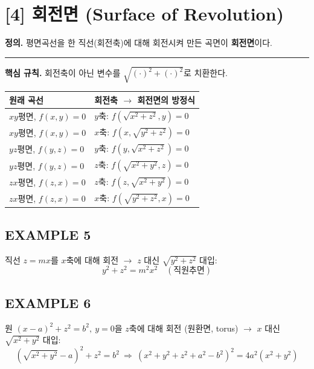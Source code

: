 \documentclass{article}
\theoremstyle{mystyle}
\begin{document}
\section*{[4] 회전면 (Surface of Revolution)}

\begin{tcolorbox}[
    colback=teal!4,
    colframe=teal!65!black,
    title=정의 \& 핵심 규칙,
    fonttitle=\bfseries,
    boxrule=0.5mm,
    arc=3mm
    ]
    \textbf{\textcolor{teal!65!black}{정의.}}\quad
    평면곡선을 한 직선(회전축)에 대해 회전시켜 만든 곡면이 \textbf{회전면}이다.

    \noindent\textcolor{teal!50!black}{\rule{\linewidth}{0.4pt}}

    \textbf{\textcolor{teal!65!black}{핵심 규칙.}}\quad
    회전축이 아닌 변수를 \(\sqrt{(\cdot)^2+(\cdot)^2}\)로 치환한다.
\end{tcolorbox}


\begin{center}
\renewcommand{\arraystretch}{1.3}
\begin{tabular}{|l|l|}
\hline
원래 곡선 & 회전축 $\to$ 회전면의 방정식 \\
\hline
\(xy\)평면, \(f(x,y)=0\) & \(y\)축: \(f(\sqrt{x^2+z^2},y)=0\) \\
\hline
\(xy\)평면, \(f(x,y)=0\) & \(x\)축: \(f(x,\sqrt{y^2+z^2})=0\) \\
\hline
\(yz\)평면, \(f(y,z)=0\) & \(y\)축: \(f(y,\sqrt{x^2+z^2})=0\) \\
\hline
\(yz\)평면, \(f(y,z)=0\) & \(z\)축: \(f(\sqrt{x^2+y^2},z)=0\) \\
\hline
\(zx\)평면, \(f(z,x)=0\) & \(z\)축: \(f(z,\sqrt{x^2+y^2})=0\) \\
\hline
\(zx\)평면, \(f(z,x)=0\) & \(x\)축: \(f(\sqrt{y^2+z^2},x)=0\) \\
\hline
\end{tabular}
\end{center}

\subsection*{EXAMPLE 5}
직선 \(z=mx\)를 \(x\)축에 대해 회전 $\to$ \(z\) 대신 \(\sqrt{y^2+z^2}\) 대입:
\[
y^2+z^2=m^2x^2 \quad(\text{직원추면})
\]

\subsection*{EXAMPLE 6}
원 \((x-a)^2+z^2=b^2,\ y=0\)을 \(z\)축에 대해 회전 (원환면, torus) $\to$ \(x\) 대신 \(\sqrt{x^2+y^2}\) 대입:
\[
\left(\sqrt{x^2+y^2}-a\right)^2+z^2=b^2
\ \Longrightarrow\
(x^2+y^2+z^2+a^2-b^2)^2=4a^2(x^2+y^2)
\]
\end{document}
